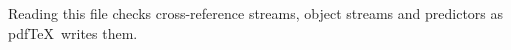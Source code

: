 \pdftrailerid{}
Reading this file checks cross-reference streams, object streams and
predictors as pdf\TeX\ writes them.
\bye
